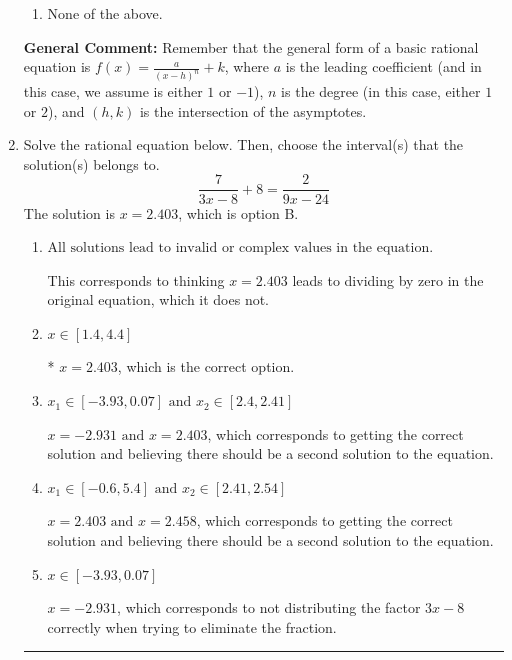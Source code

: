 \documentclass{extbook}[14pt]
\newcommand{\litem}[1]{\item #1

\rule{\textwidth}{0.4pt}}
\begin{document}
\begin{enumerate}
{\begin{enumerate}[label=\Alph*.]
\item None of the above.\end{enumerate}
\textbf{General Comment:} Remember that the general form of a basic rational equation is $ f(x) = \frac{a}{(x-h)^n} + k$, where $a$ is the leading coefficient (and in this case, we assume is either $1$ or $-1$), $n$ is the degree (in this case, either $1$ or $2$), and $(h, k)$ is the intersection of the asymptotes.
}
\litem{
Solve the rational equation below. Then, choose the interval(s) that the solution(s) belongs to.
\[ \frac{7}{3x -8} + 8 = \frac{2}{9x -24} \]The solution is \( x = 2.403 \), which is option B.\begin{enumerate}[label=\Alph*.]
\item \( \text{All solutions lead to invalid or complex values in the equation.} \)

This corresponds to thinking $x = 2.403$ leads to dividing by zero in the original equation, which it does not.
\item \( x \in [1.4,4.4] \)

* $x = 2.403$, which is the correct option.
\item \( x_1 \in [-3.93, 0.07] \text{ and } x_2 \in [2.4,2.41] \)

$x = -2.931 \text{ and } x = 2.403$, which corresponds to getting the correct solution and believing there should be a second solution to the equation.
\item \( x_1 \in [-0.6, 5.4] \text{ and } x_2 \in [2.41,2.54] \)

$x = 2.403 \text{ and } x = 2.458$, which corresponds to getting the correct solution and believing there should be a second solution to the equation.
\item \( x \in [-3.93,0.07] \)

$x = -2.931$, which corresponds to not distributing the factor $3x -8$ correctly when trying to eliminate the fraction.
\end{enumerate}

}
\end{enumerate}
\end{document}
